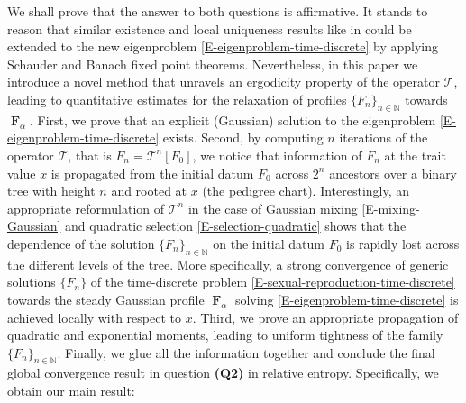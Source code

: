 \documentclass[reqno]{amsart}
\DeclareMathOperator{\bF}{\boldsymbol{F}}
\numberwithin{equation}{section}
\begin{document}
{We shall prove that the answer to both questions is affirmative. It stands to reason that similar existence and local uniqueness results like in \cite{BCGL-17-arxiv,CGP-19} could be extended to the new eigenproblem \eqref{E-eigenproblem-time-discrete} by applying Schauder and Banach fixed point theorems. Nevertheless, in this paper we introduce a novel method that unravels an ergodicity property of the operator $\mathcal{T}$, leading to quantitative estimates for the relaxation of profiles $\{F_n\}_{n\in \mathbb{N}}$ towards $\bF_\alpha$. First, we prove that an explicit (Gaussian) solution to the eigenproblem \eqref{E-eigenproblem-time-discrete} exists. Second, by computing $n$ iterations of the operator $\mathcal{T}$, that is $F_n=\mathcal{T}^n[F_0]$, we notice that information of $F_n$ at the trait value $x$ is propagated from the initial datum $F_0$ across $2^n$ ancestors over a binary tree with height $n$ and rooted at $x$ (the pedigree chart). Interestingly, an appropriate reformulation of $\mathcal{T}^n$ in the case of Gaussian mixing \eqref{E-mixing-Gaussian} and quadratic selection \eqref{E-selection-quadratic} shows that the dependence of the solution $\{F_n\}_{n\in \mathbb{N}}$ on the initial datum $F_0$ is rapidly lost across the different levels of the tree. More specifically, a strong convergence of generic solutions $\{F_n\}$ of the time-discrete problem \eqref{E-sexual-reproduction-time-discrete} towards the steady Gaussian profile $\bF_\alpha$ solving \eqref{E-eigenproblem-time-discrete} is achieved locally with respect to $x$. Third, we prove an appropriate propagation of quadratic and exponential moments, leading to uniform tightness of the family $\{F_n\}_{n\in \mathbb{N}}$. Finally, we glue all the information together and conclude the final global convergence result in question {\bf (Q2)} in relative entropy. Specifically, we obtain our main result:


}
\end{document}
